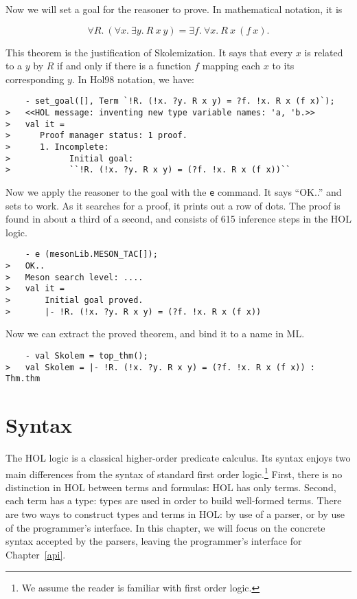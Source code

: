Now we will set a goal for the reasoner to prove. In mathematical
notation, it is

\[\forall R.\ (\forall x.\  \exists y.\ R\ x\ y) = \exists f.\ \forall
 x.\ R\ x\ (f\ x).\]  

 This theorem is the justification of Skolemization. It says that 
every $x$ is related to a $y$ by $R$ if and only if there is
a function $f$ mapping each $x$ to its corresponding $y$. In Hol98
notation, we have:
\begin{verbatim}
    - set_goal([], Term `!R. (!x. ?y. R x y) = ?f. !x. R x (f x)`);
>   <<HOL message: inventing new type variable names: 'a, 'b.>>
>   val it =
>      Proof manager status: 1 proof.
>      1. Incomplete:
>            Initial goal:
>            ``!R. (!x. ?y. R x y) = (?f. !x. R x (f x))``
\end{verbatim}         

Now we apply the reasoner to the goal with the \verb+e+ command. It says
``OK..'' and sets to work. As it searches for a proof, it prints out a
row of dots. The proof is found in about a third of a second, and
consists of 615 inference steps in the HOL logic.
\begin{verbatim}
    - e (mesonLib.MESON_TAC[]);
>   OK..
>   Meson search level: ....
>   val it =
>       Initial goal proved.
>       |- !R. (!x. ?y. R x y) = (?f. !x. R x (f x))
\end{verbatim}

Now we can extract the proved theorem, and
bind it to a name in ML. 
\begin{verbatim}
    - val Skolem = top_thm();
>   val Skolem = |- !R. (!x. ?y. R x y) = (?f. !x. R x (f x)) : Thm.thm
\end{verbatim}


 \chapter{Syntax}

   The HOL logic is a classical higher-order predicate calculus. Its
syntax enjoys two main differences from the syntax of standard first
order logic.\footnote{We assume the reader is familiar with first order
logic.}  First, there is no distinction in HOL between terms and
formulas: HOL has only terms. Second, each term has a type: types are
used in order to build well-formed terms. There are two ways to
construct types and terms in HOL: by use of a parser, or by use of the
programmer's interface. In this chapter, we will focus on the concrete
syntax accepted by the parsers, leaving the programmer's interface for
Chapter~\ref{api}.


